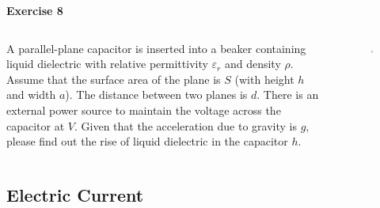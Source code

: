 \documentclass{beamer}
\begin{document}
\begin{frame}{\bf Exercise 8}
\begin{columns}
    \begin{column}{.7\linewidth}
        A parallel-plane capacitor is inserted into a beaker containing liquid dielectric with relative permittivity $\varepsilon_{r}$ and density $\rho$. 
        Assume that the surface area of the plane is $S$ (with height $h$ and width $a$). The distance between two planes is $d$. There is an external power 
        source to maintain the voltage across the capacitor at $V$. Given that the acceleration due to gravity is $g$, please find out the rise of liquid dielectric in the capacitor $h$.
    \end{column}
    \begin{column}{.3\linewidth}
        \begin{figure}
            \centering
            \includegraphics[scale=0.6]{images/014.png}
        \end{figure}
    \end{column}
\end{columns}
\end{frame}


\subsection{\bf Electric Current}
\end{document}
